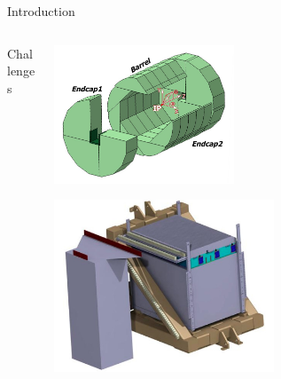 \documentclass[10pt]{beamer}
\begin{document}
\begin{frame}[shrink=5]{Introduction}
\begin{columns}
\begin{column}{0.6\textwidth}
\begin{block}{\small  Challenges}
{        }
      \end{block}

    \end{column}

    \begin{column}{0.45\textwidth}
      \centerline{\includegraphics[width=0.45\textwidth]{jpg/IldDhcal}}
      \centerline{\includegraphics[width=0.55\textwidth]{jpg/DHCALProtoSchema}}
    \end{column}
  \end{columns}
\end{frame}
\end{document}
